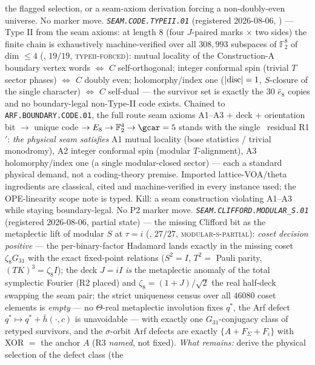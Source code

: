 the flagged selection, or a seam-axiom derivation forcing a
non-doubly-even universe.  No marker move.
\emph{\texttt{SEAM.CODE.TYPEII.01}} (registered 2026-08-06, \mC)
--- Type II from the seam axioms: at length $8$ (four $J$-paired
marks $\times$ two sides) the finite chain is exhaustively
machine-verified over all $308{,}993$ subspaces of
$\mathbb F_2^8$ of dim $\le4$
(, $19/19$,
\textsc{typeii-forced}): mutual locality of the Construction-A
boundary vertex words $\iff$ $C$ self-orthogonal; integer
conformal spin (trivial $T$ sector phases) $\iff$ $C$ doubly even;
holomorphy/index one ($|{\rm disc}|=1$, $S$-closure of the single
character) $\iff$ $C$ self-dual --- the survivor set is exactly
the $30$ $\hat e_8$ copies and no boundary-legal non-Type-II code
exists.  Chained to \texttt{ARF.BOUNDARY.CODE.01}, the full route
seam axioms A1--A3 $+$ deck $+$ orientation bit $\to$ unique code
$\to E_8\to\mathbb F_2^4\to\gcar=5$ stands with the single \mC\
residual R1$'$: \emph{the physical seam satisfies} A1 mutual
locality (bose statistics / trivial monodromy), A2 integer
conformal spin (modular $T$-alignment), A3 holomorphy/index one
(a single modular-closed sector) --- each a standard physical
demand, not a coding-theory premise.  Imported lattice-VOA/theta
ingredients are classical, cited and machine-verified in every
instance used; the OPE-linearity scope note is typed.  Kill: a
seam construction violating A1--A3 while staying boundary-legal.
No P2 marker move.
\emph{\texttt{SEAM.CLIFFORD.MODULAR\_S.01}} (registered
2026-08-06, partial state) --- the missing Clifford bit as the
metaplectic lift of modular $S$ at $\tau=i$
(, $27/27$,
\textsc{modular-s-partial}): \emph{coset decision positive} ---
the per-binary-factor Hadamard lands exactly in the missing coset
$\zeta_8G_{31}$ with the exact fixed-point relations ($S^2=I$,
$T^2=$ Pauli parity, $(TK)^3=\zeta_8I$); the deck $J=iI$ \emph{is}
the metaplectic anomaly of the total symplectic Fourier (R2
placed) and $\zeta_8=(1{+}J)/\sqrt2$ the real half-deck swapping
the seam pair; the strict uniqueness census over all $46080$ coset
elements is \emph{empty} --- no $\Theta$-real metaplectic
involution fixes $q^{*}$, the Arf defect
$q^{*}\mapsto q^{*}+\bar h(\cdot,c)$ is unavoidable --- with
exactly one $G_{31}$-conjugacy class of retyped survivors, and the
$\sigma$-orbit Arf defects are exactly $\{A+F_\Sigma+F_i\}$ with
XOR $=$ the anchor $A$ (R3 \emph{named}, not fixed).  \emph{What
remains:} derive the physical selection of the defect class (the

